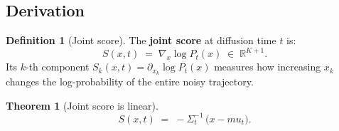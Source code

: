 \documentclass[12pt, a4paper]{article}
\def\bx{x}%
\def\bmu{mu}%
\def\bm#1{#1}%
\theoremstyle{definition}
\newtheorem{definition}{Definition}[section]
\newtheorem{theorem}{Theorem}[section]
\newcommand{\R}{\mathbb{R}}
\newcommand{\bx}{\bm{x}}
\newcommand{\bmu}{\bm{\mu}}
\begin{document}
\subsection{Derivation}

\begin{definition}[Joint score]
The \textbf{joint score} at diffusion time $t$ is:
\[
  \bm{S}(\bx, t)
  \;=\;
  \nabla_{\bx}\log P_t(\bx)
  \;\in\; \R^{K+1}.
\]
Its $k$-th component $S_k(\bx,t) = \partial_{x_k}\log P_t(\bx)$
measures how increasing $x_k$ changes the log-probability of the
entire noisy trajectory.
\end{definition}

\begin{theorem}[Joint score is linear]\label{thm:score}
\[
  \bm{S}(\bx, t)
  \;=\;
  -\Sigma_t^{-1}\,\bigl(\bx - \bmu_t\bigr).
\]
\end{theorem}
\end{document}
